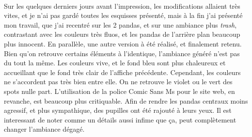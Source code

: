             \begin{center}
                \\
            \end{center}
            
                            Sur les quelques derniers jours avant l'impression, les modifications allaient très vites, et je n'ai pas gardé toutes les esquisses présenté, mais à la fin j'ai présenté mon travail, que j'ai recentré sur les 2 pandas, et sur une ambiance plus \emph{trash}, contrastant avec les couleurs très fluos, et les pandas de l'arrière plan beaucoup plus innocent.
                En parallèle, une autre version à été réalisé, et finalement retenu.
                Bien qu'on retrouve certains éléments à l'identique, l'ambiance généré n'est pas du tout la même.
                Les couleurs vive, et le fond bleu sont plus chaleureux et accueillant que le fond très clair de l'affiche précédente.
                Cependant, les couleurs ne s'accordent pas très bien entre elle. On ne retrouve le violet ou le vert des spots nulle part. L'utilisation de la police Comic Sans Ms pour le site web, en revanche, est beaucoup plus critiquable.
                Afin de rendre les pandas centraux moins agressif, et plus sympathique, des pupilles ont été rajouté à leurs yeux.
                Il est interessant de noter comme un détails aussi infime que ça, peut complètement changer l'ambiance dégagé.
            
